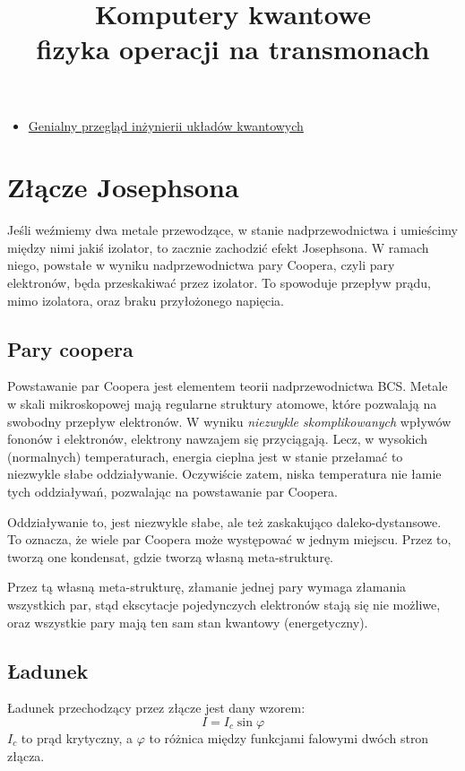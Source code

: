 \documentclass{../notatki}
\title{Komputery kwantowe \\ fizyka operacji na transmonach}
\begin{document}
\begin{itemize}
  \item \href{https://arxiv.org/pdf/1904.06560}{Genialny przegląd inżynierii
    układów kwantowych}
\end{itemize}

\section{Złącze Josephsona}

Jeśli weźmiemy dwa metale przewodzące, w stanie nadprzewodnictwa i umieścimy
między nimi jakiś izolator, to zacznie zachodzić efekt Josephsona. W ramach
niego, powstałe w wyniku nadprzewodnictwa pary Coopera, czyli pary elektronów,
będa przeskakiwać przez izolator. To spowoduje przepływ prądu, mimo izolatora,
oraz braku przyłożonego napięcia.

\subsection{Pary coopera}

Powstawanie par Coopera jest elementem teorii nadprzewodnictwa BCS. Metale
w skali mikroskopowej mają regularne struktury atomowe, które pozwalają na
swobodny przepływ elektronów. W wyniku \textit{niezwykle skomplikowanych}
wpływów fononów i elektronów, elektrony nawzajem się przyciągają.
Lecz, w wysokich (normalnych) temperaturach, energia cieplna jest w stanie
przełamać to niezwykle słabe oddziaływanie. Oczywiście zatem, niska temperatura
nie łamie tych oddziaływań, pozwalając na powstawanie par Coopera.

Oddziaływanie to, jest niezwykle słabe, ale też zaskakująco daleko-dystansowe.
To oznacza, że wiele par Coopera może występować w jednym miejscu.
Przez to, tworzą one kondensat, gdzie tworzą własną meta-strukturę.

Przez tą własną meta-strukturę, złamanie jednej pary wymaga złamania wszystkich
par, stąd ekscytacje pojedynczych elektronów stają się nie możliwe,
oraz wszystkie pary mają ten sam stan kwantowy (energetyczny).

\subsection{Ładunek}

Ładunek przechodzący przez złącze jest dany wzorem:
$$
I = I_c \sin \varphi
$$
$I_c$ to prąd krytyczny, a $\varphi$ to różnica między funkcjami falowymi
dwóch stron złącza.
\end{document}
